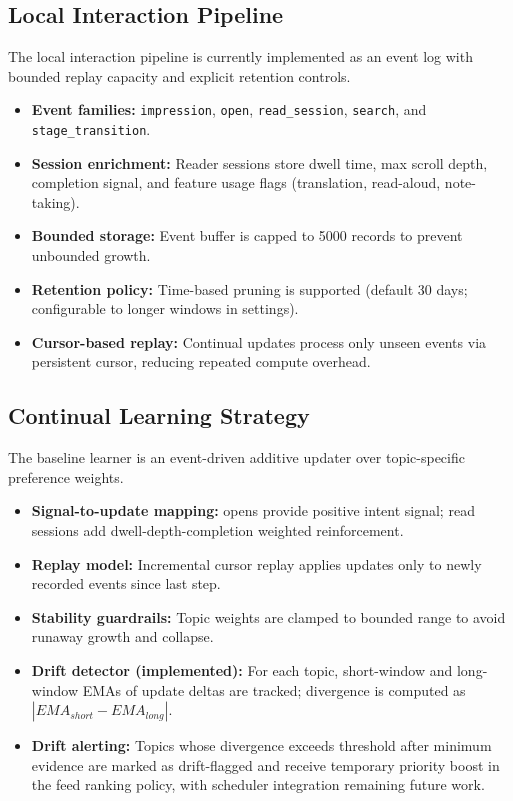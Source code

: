 \documentclass[11pt]{article}
\begin{document}
\subsection{Local Interaction Pipeline}
The local interaction pipeline is currently implemented as an event log with bounded replay capacity and explicit retention controls.

\begin{itemize}[leftmargin=*]
\item \textbf{Event families:} \texttt{impression}, \texttt{open}, \texttt{read\_session}, \texttt{search}, and \texttt{stage\_transition}.
\item \textbf{Session enrichment:} Reader sessions store dwell time, max scroll depth, completion signal, and feature usage flags (translation, read-aloud, note-taking).
\item \textbf{Bounded storage:} Event buffer is capped to 5000 records to prevent unbounded growth.
\item \textbf{Retention policy:} Time-based pruning is supported (default 30 days; configurable to longer windows in settings).
\item \textbf{Cursor-based replay:} Continual updates process only unseen events via persistent cursor, reducing repeated compute overhead.
\end{itemize}

\subsection{Continual Learning Strategy}
The baseline learner is an event-driven additive updater over topic-specific preference weights.

\begin{itemize}[leftmargin=*]
\item \textbf{Signal-to-update mapping:} opens provide positive intent signal; read sessions add dwell-depth-completion weighted reinforcement.
\item \textbf{Replay model:} Incremental cursor replay applies updates only to newly recorded events since last step.
\item \textbf{Stability guardrails:} Topic weights are clamped to bounded range to avoid runaway growth and collapse.
\item \textbf{Drift detector (implemented):} For each topic, short-window and long-window EMAs of update deltas are tracked; divergence is computed as $|EMA_{short}-EMA_{long}|$.
\item \textbf{Drift alerting:} Topics whose divergence exceeds threshold after minimum evidence are marked as drift-flagged and receive temporary priority boost in the feed ranking policy, with scheduler integration remaining future work.
\end{itemize}
\end{document}
